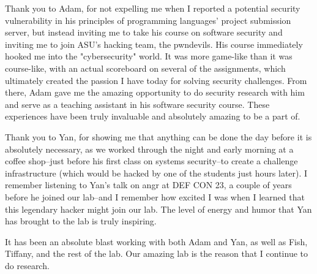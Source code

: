 \leavevmode\vfill
Thank you to Adam, for not expelling me when I reported a potential security vulnerability in his principles of programming languages' project submission server, but instead inviting me to take his course on software security and inviting me to join ASU's hacking team, the pwndevils.
His course immediately hooked me into the "cybersecurity" world.
It was more game-like than it was course-like, with an actual scoreboard on several of the assignments, which ultimately created the passion I have today for solving security challenges.
From there, Adam gave me the amazing opportunity to do security research with him and serve as a teaching assistant in his software security course.
These experiences have been truly invaluable and absolutely amazing to be a part of.

Thank you to Yan, for showing me that anything can be done the day before it is absolutely necessary, as we worked through the night and early morning at a coffee shop--just before his first class on systems security--to create a challenge infrastructure (which would be hacked by one of the students just hours later).
I remember listening to Yan's talk on angr at DEF CON 23, a couple of years before he joined our lab--and I remember how excited I was when I learned that this legendary hacker might join our lab.
The level of energy and humor that Yan has brought to the lab is truly inspiring.

It has been an absolute blast working with both Adam and Yan, as well as Fish, Tiffany, and the rest of the lab. Our amazing lab is the reason that I continue to do research.
\vfill
